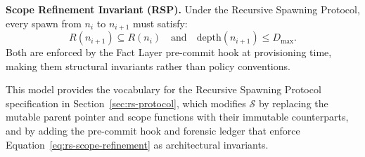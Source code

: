 \medskip
\noindent\textbf{Scope Refinement Invariant (RSP).}
Under the Recursive Spawning Protocol, every spawn from $n_i$ to $n_{i+1}$ must satisfy:
\begin{equation}
R(n_{i+1}) \subseteq R(n_i) \quad \text{and} \quad \mathrm{depth}(n_{i+1}) \leq D_{\max}.
\label{eq:rs-scope-refinement}
\end{equation}
Both are enforced by the Fact Layer pre-commit hook at provisioning time, making them structural invariants rather than policy conventions.

This model provides the vocabulary for the Recursive Spawning Protocol specification in Section~\ref{sec:rs-protocol}, which modifies $\mathcal{S}$ by replacing the mutable parent pointer and scope functions with their immutable counterparts, and by adding the pre-commit hook and forensic ledger that enforce Equation~\ref{eq:rs-scope-refinement} as architectural invariants.